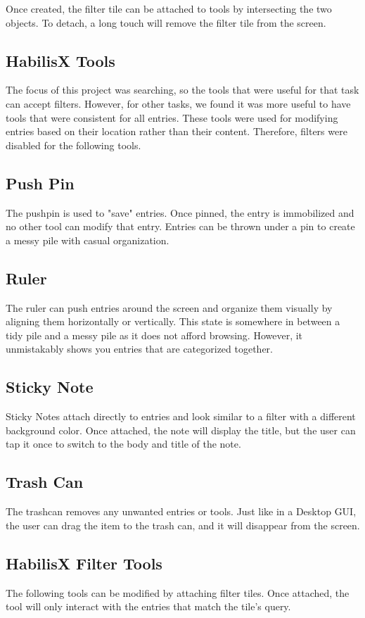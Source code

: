 \documentclass{article}
\begin{document}
Once created, the filter tile can be attached to tools by intersecting the two objects.  To detach, a long touch will remove the filter tile from the screen.

\subsection{HabilisX Tools}
The focus of this project was searching, so the tools that were useful for that task can accept filters. However, for other tasks, we found it was more useful to have tools that were consistent for all entries.  These tools were used for modifying entries based on their location rather than their content.  Therefore, filters were disabled for the following tools.
\subsection*{Push Pin}
The pushpin is used to "save" entries.  Once pinned, the entry is immobilized and no other tool can modify that entry.  Entries can be thrown under a pin to create a messy pile with casual organization.  
\subsection*{Ruler}
The ruler can push entries around the screen and organize them visually by aligning them horizontally or vertically.  This state is somewhere in between a tidy pile and a messy pile\cite{Agarawala2006} as it does not afford browsing.  However, it unmistakably shows you entries that are categorized together.  
\subsection*{Sticky Note}
Sticky Notes attach directly to entries and look similar to a filter with a different background color.  Once attached, the note will display the title, but the user can tap it once to switch to the body and title of the note.
\subsection*{Trash Can}
The trashcan removes any unwanted entries or tools.  Just like in a Desktop GUI, the user can drag the item to the trash can, and it will disappear from the screen.  
\subsection{HabilisX Filter Tools}
The following tools can be modified by attaching filter tiles.  Once attached, the tool will only interact with the entries that match the tile's query.  
\end{document}
